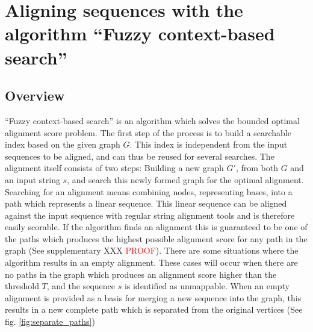 \documentclass{article}
\begin{document}
\section{Aligning sequences with the algorithm ``Fuzzy context-based search''}
\subsection{Overview}
``Fuzzy context-based search'' is an algorithm which solves the bounded optimal alignment score problem. The first step of the process is to build a searchable index based on the given graph $G$. This index is independent from the input sequences to be aligned, and can thus be reused for several searches. The alignment itself consists of two steps: Building a new graph $G'$, from both $G$ and an input string $s$, and search this newly formed graph for the optimal alignment. Searching for an alignment means combining nodes, representing bases, into a path which represents a linear sequence. This linear sequence can be aligned against the input sequence with regular string alignment tools and is therefore easily scorable. If the algorithm finds an alignment this is guaranteed to be one of the paths which produces the highest possible alignment score for any path in the graph (See supplementary XXX \textcolor{red}{PROOF}). There are some situations where the algorithm results in an empty alignment. These cases will occur when there are no paths in the graph which produces an alignment score higher than the threshold $T$, and the sequence $s$ is identified as unmappable. When an empty alignment is provided as a basis for merging a new sequence into the graph, this results in a new complete path which is separated from the original vertices (See fig. \ref{fig:separate_paths})
\end{document}
